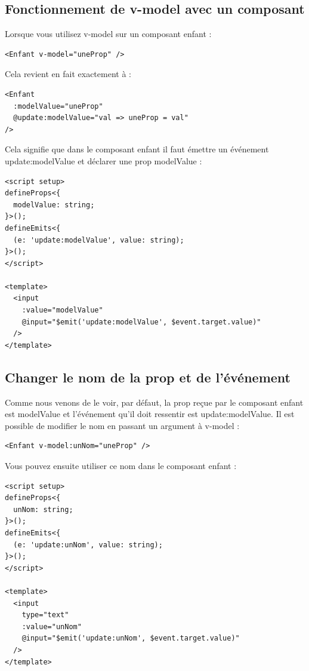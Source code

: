 \documentclass{article}
\begin{document}
\subsection{Fonctionnement de {\color{monOrange}v-model} avec un composant}
Lorsque vous utilisez {\color{monOrange}v-model} sur un composant enfant :
\begin{verbatim}
<Enfant v-model="uneProp" />
\end{verbatim}
Cela revient en fait exactement à :
\begin{verbatim}
<Enfant
  :modelValue="uneProp"
  @update:modelValue="val => uneProp = val"
/>
\end{verbatim}
Cela signifie que dans le composant enfant il faut émettre un événement {\color{monOrange}update:modelValue} et déclarer une {\color{monOrange}prop modelValue} :
\begin{verbatim}
<script setup>
defineProps<{
  modelValue: string;
}>();
defineEmits<{
  (e: 'update:modelValue', value: string);
}>();
</script>

<template>
  <input
    :value="modelValue"
    @input="$emit('update:modelValue', $event.target.value)"
  />
</template>
\end{verbatim}
\subsection{Changer le nom de la {\color{monOrange}prop} et de l'événement}
Comme nous venons de le voir, par défaut, la {\color{monOrange}prop} reçue par le composant enfant est {\color{monOrange}modelValue} et l'événement qu'il doit ressentir est {\color{monOrange}update:modelValue}. Il est possible de modifier le nom en passant un argument à {\color{monOrange}v-model} :
\begin{verbatim}
<Enfant v-model:unNom="uneProp" />
\end{verbatim}
Vous pouvez ensuite utiliser ce nom dans le composant enfant :
\begin{verbatim}
<script setup>
defineProps<{
  unNom: string;
}>();
defineEmits<{
  (e: 'update:unNom', value: string);
}>();
</script>

<template>
  <input
    type="text"
    :value="unNom"
    @input="$emit('update:unNom', $event.target.value)"
  />
</template>
\end{verbatim}
\end{document}
